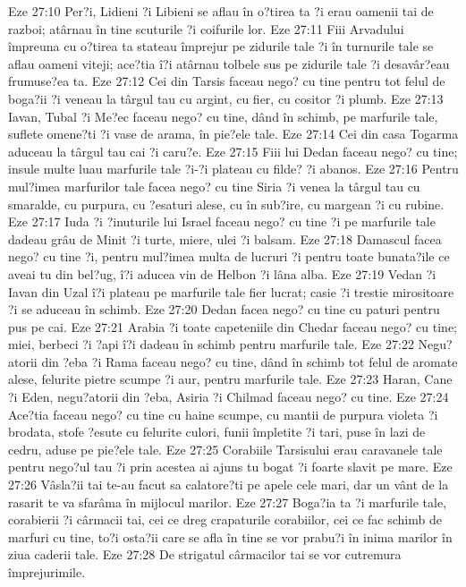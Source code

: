 Eze 27:10  Per?i, Lidieni ?i Libieni se aflau în o?tirea ta ?i erau oamenii tai de razboi; atârnau în tine scuturile ?i coifurile lor.
Eze 27:11  Fiii Arvadului împreuna cu o?tirea ta stateau împrejur pe zidurile tale ?i în turnurile tale se aflau oameni viteji; ace?tia î?i atârnau tolbele sus pe zidurile tale ?i desavâr?eau frumuse?ea ta.
Eze 27:12  Cei din Tarsis faceau nego? cu tine pentru tot felul de boga?ii ?i veneau la târgul tau cu argint, cu fier, cu cositor ?i plumb.
Eze 27:13  Iavan, Tubal ?i Me?ec faceau nego? cu tine, dând în schimb, pe marfurile tale, suflete omene?ti ?i vase de arama, în pie?ele tale.
Eze 27:14  Cei din casa Togarma aduceau la târgul tau cai ?i caru?e.
Eze 27:15  Fiii lui Dedan faceau nego? cu tine; insule multe luau marfurile tale ?i-?i plateau cu filde? ?i abanos.
Eze 27:16  Pentru mul?imea marfurilor tale facea nego? cu tine Siria ?i venea la târgul tau cu smaralde, cu purpura, cu ?esaturi alese, cu în sub?ire, cu margean ?i cu rubine.
Eze 27:17  Iuda ?i ?inuturile lui Israel faceau nego? cu tine ?i pe marfurile tale dadeau grâu de Minit ?i turte, miere, ulei ?i balsam.
Eze 27:18  Damascul facea nego? cu tine ?i, pentru mul?imea multa de lucruri ?i pentru toate bunata?ile ce aveai tu din bel?ug, î?i aducea vin de Helbon ?i lâna alba.
Eze 27:19  Vedan ?i Iavan din Uzal î?i plateau pe marfurile tale fier lucrat; casie ?i trestie mirositoare ?i se aduceau în schimb.
Eze 27:20  Dedan facea nego? cu tine cu paturi pentru pus pe cai.
Eze 27:21  Arabia ?i toate capeteniile din Chedar faceau nego? cu tine; miei, berbeci ?i ?api î?i dadeau în schimb pentru marfurile tale.
Eze 27:22  Negu?atorii din ?eba ?i Rama faceau nego? cu tine, dând în schimb tot felul de aromate alese, felurite pietre scumpe ?i aur, pentru marfurile tale.
Eze 27:23  Haran, Cane ?i Eden, negu?atorii din ?eba, Asiria ?i Chilmad faceau nego? cu tine.
Eze 27:24  Ace?tia faceau nego? cu tine cu haine scumpe, cu mantii de purpura violeta ?i brodata, stofe ?esute cu felurite culori, funii împletite ?i tari, puse în lazi de cedru, aduse pe pie?ele tale.
Eze 27:25  Corabiile Tarsisului erau caravanele tale pentru nego?ul tau ?i prin acestea ai ajuns tu bogat ?i foarte slavit pe mare.
Eze 27:26  Vâsla?ii tai te-au facut sa calatore?ti pe apele cele mari, dar un vânt de la rasarit te va sfarâma în mijlocul marilor.
Eze 27:27  Boga?ia ta ?i marfurile tale, corabierii ?i cârmacii tai, cei ce dreg crapaturile corabiilor, cei ce fac schimb de marfuri cu tine, to?i osta?ii care se afla în tine se vor prabu?i în inima marilor în ziua caderii tale.
Eze 27:28  De strigatul cârmacilor tai se vor cutremura împrejurimile.
